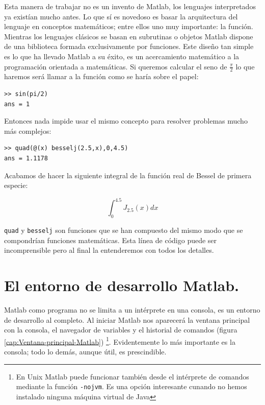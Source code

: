 Esta manera de trabajar no es un invento de Matlab, los lenguajes
interpretados ya existían mucho antes. Lo que sí es novedoso es basar
la arquitectura del lenguaje en conceptos matemáticos; entre ellos uno
muy importante: la función. Mientras los lenguajes clásicos se basan
en subrutinas o objetos Matlab dispone de una biblioteca formada
exclusivamente por funciones. Este diseño tan simple es lo que ha
llevado Matlab a su éxito, es un acercamiento matemático a la
programación orientada a matemáticas. Si queremos calcular el seno de
$\frac{\pi}{2}$ lo que haremos será llamar a la función como se haría
sobre el papel:

\begin{lstlisting}
>> sin(pi/2)
ans = 1
\end{lstlisting}
Entonces nada impide usar el mismo concepto para resolver problemas
mucho más complejos:

\begin{lstlisting}
>> quad(@(x) besselj(2.5,x),0,4.5)
ans = 1.1178
\end{lstlisting}
Acabamos de hacer la siguiente integral de la función real de Bessel
de primera especie:

$$\int_{0}^{4.5}J_{2.5}(x)dx$$

\texttt{quad} y \texttt{besselj} son funciones que se
han compuesto del mismo modo que se compondrían funciones matemáticas.
Esta línea de código puede ser incomprensible pero al final la
entenderemos con todos los detalles.


\section{El entorno de desarrollo Matlab.}

Matlab como programa no se limita a un intérprete en una consola, es
un entorno de desarrollo al completo. Al iniciar Matlab nos aparecerá
la ventana principal con la consola, el navegador de variables y el
historial de comandos (figura \ref{cap:Ventana-principal-Matlab})%
\footnote{En Unix Matlab puede funcionar también desde el intérprete
de comandos mediante la función \texttt{-nojvm}.  Es una opción interesante
cunando no hemos instalado ninguna máquina virtual de Java}. Evidentemente
lo más importante es la consola; todo lo demás, aunque útil, es prescindible.


